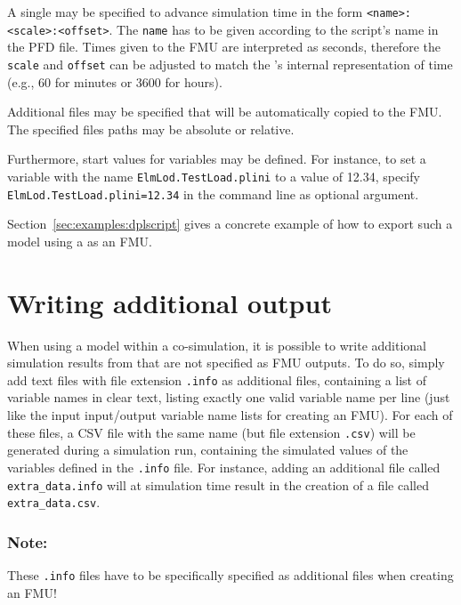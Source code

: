 A single \dplscript may be specified to advance simulation time in the form \texttt{<name>:<scale>:<offset>}.
The \texttt{name} has to be given according to the script's name in the PFD file.
Times given to the FMU are interpreted as seconds, therefore the \texttt{scale} and \texttt{offset} can be adjusted to match the \dplscript's internal representation of time (e.g., 60 for minutes or 3600 for hours).

Additional files may be specified that will be automatically copied to the FMU. The specified files paths may be absolute or relative.

Furthermore, start values for variables may be defined. For instance, to set a variable with the name \texttt{ElmLod.TestLoad.plini} to a value of 12.34, specify \texttt{ElmLod.TestLoad.plini=12.34} in the command line as optional argument.

Section~\ref{sec:examples:dplscript} gives a concrete example of how to export such a model using a \dplscript as an FMU.


\section{Writing additional output}
\label{sec:export:additional_output}

When using a \pf model within a co-simulation, it is possible to write additional simulation results from \pf that are not specified as FMU outputs.
To do so, simply add text files with file extension \texttt{.info} as additional files, containing a list of variable names in clear text, listing exactly one valid variable name per line (just like the input input/output variable name lists for creating an FMU).
For each of these files, a CSV file with the same name (but file extension \texttt{.csv}) will be generated during a simulation run, containing the simulated values of the variables defined in the \texttt{.info} file.
For instance, adding an additional file called \texttt{extra\_data.info} will at simulation time result in the creation of a file called \texttt{extra\_data.csv}.

\subsubsection*{Note:}
These \texttt{.info} files have to be specifically specified as additional files when creating an FMU!